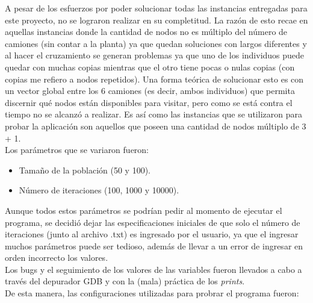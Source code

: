 \documentclass[letter, 10pt]{article}
\begin{document}
A pesar de los esfuerzos por poder solucionar todas las instancias entregadas para este proyecto, no se lograron realizar en su completitud. La razón de esto recae en aquellas instancias donde la cantidad de nodos no es múltiplo del número de camiones (sin contar a la planta) ya que quedan soluciones con largos diferentes y al hacer el cruzamiento se generan problemas ya que uno de los individuos puede quedar con muchas copias mientras que el otro tiene pocas o nulas copias (con copias me refiero a nodos repetidos). Una forma teórica de solucionar esto es con un vector global entre los 6 camiones (es decir, ambos individuos) que permita discernir qué nodos están disponibles para visitar, pero como se está contra el tiempo no se alcanzó a realizar. Es así como las instancias que se utilizaron para probar la aplicación son aquellos que poseen una cantidad de nodos múltiplo de 3 + 1. \\

Los parámetros que se variaron fueron:

\begin{itemize}
    \item Tamaño de la población (50 y 100).
    \item Número de iteraciones (100, 1000 y 10000).
\end{itemize}

Aunque todos estos parámetros se podrían pedir al momento de ejecutar el programa, se decidió dejar las especificaciones iniciales de que solo el número de iteraciones (junto al archivo .txt) es ingresado por el usuario, ya que el ingresar muchos parámetros puede ser tedioso, además de llevar a un error de ingresar en orden incorrecto los valores. \\

Los bugs y el seguimiento de los valores de las variables fueron llevados a cabo a través del depurador GDB y con la (mala) práctica de los \textit{prints}.\\

De esta manera, las configuraciones utilizadas para probrar el programa fueron:
\end{document}

